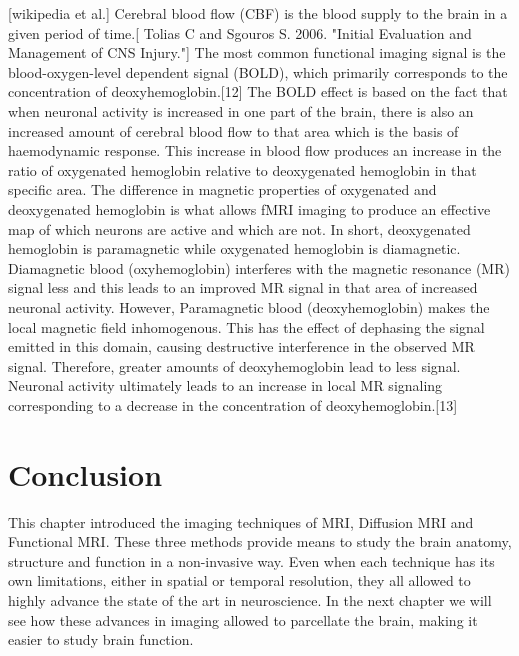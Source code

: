 [wikipedia et al.]
Cerebral blood flow (CBF) is the blood supply to the brain in a given period of time.[     Tolias C and Sgouros S. 2006. "Initial Evaluation and Management of CNS Injury."]
The most common functional imaging signal is the blood-oxygen-level dependent signal (BOLD), which primarily corresponds to the concentration of deoxyhemoglobin.[12] The BOLD effect is based on the fact that when neuronal activity is increased in one part of the brain, there is also an increased amount of cerebral blood flow to that area which is the basis of haemodynamic response. This increase in blood flow produces an increase in the ratio of oxygenated hemoglobin relative to deoxygenated hemoglobin in that specific area. The difference in magnetic properties of oxygenated and deoxygenated hemoglobin is what allows fMRI imaging to produce an effective map of which neurons are active and which are not. In short, deoxygenated hemoglobin is paramagnetic while oxygenated hemoglobin is diamagnetic. Diamagnetic blood (oxyhemoglobin) interferes with the magnetic resonance (MR) signal less and this leads to an improved MR signal in that area of increased neuronal activity. However, Paramagnetic blood (deoxyhemoglobin) makes the local magnetic field inhomogenous. This has the effect of dephasing the signal emitted in this domain, causing destructive interference in the observed MR signal. Therefore, greater amounts of deoxyhemoglobin lead to less signal. Neuronal activity ultimately leads to an increase in local MR signaling corresponding to a decrease in the concentration of deoxyhemoglobin.[13]

\section{Conclusion}
This chapter introduced the imaging techniques of MRI, Diffusion MRI and
Functional MRI. These three methods provide means to study the brain anatomy,
structure and function in a non-invasive way. Even when each technique has its
own limitations, either in spatial or temporal resolution, they all allowed to
highly advance the state of the art in neuroscience. In the next chapter we
will see how these advances in imaging allowed to parcellate the brain, making
it easier to study brain function.

\chapterbib
